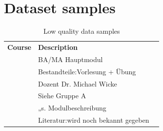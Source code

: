 \section{Dataset samples}

\begin{table}[H]
	\centering
	\caption{Sample Duplicates in the Siddata-dataset.   data_exploration_Siddata2021.ipynb }
	\label{tab:sample_duplicates}
\end{table}



\begin{table}[H]
	\centering
	\begin{tabular}{lll}
	\textbf{Course} & \textbf{Description}  \\
		                   & BA/MA Hauptmodul \\
		                   & Bestandteile:Vorlesung + Übung \\
		                   & Dozent  Dr. Michael Wicke \\
			               & Siehe Gruppe A \\
			               & „s. Modulbeschreibung \\
						   & Literatur:wird noch bekannt gegeben
	\end{tabular}%
	\caption{Low quality data samples }
	\label{tab:sample_descriptions}
\end{table}